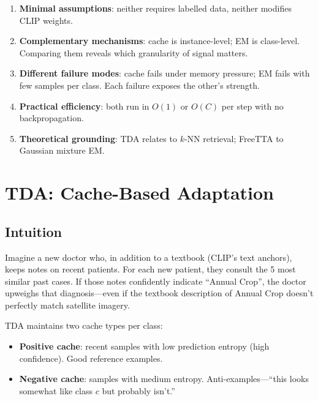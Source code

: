 \documentclass[12pt,a4paper]{article}
\newcommand{\1}{\mathbf{1}}
\begin{document}
\begin{enumerate}[leftmargin=1.5em]
  \item \textbf{Minimal assumptions}: neither requires labelled data, neither modifies CLIP weights.
  \item \textbf{Complementary mechanisms}: cache is instance-level; EM is class-level.
        Comparing them reveals which granularity of signal matters.
  \item \textbf{Different failure modes}: cache fails under memory pressure; EM fails with few samples per class.
        Each failure exposes the other's strength.
  \item \textbf{Practical efficiency}: both run in $O(1)$ or $O(C)$ per step with no backpropagation.
  \item \textbf{Theoretical grounding}: TDA relates to $k$-NN retrieval; FreeTTA to Gaussian mixture EM.
\end{enumerate}

\section{TDA: Cache-Based Adaptation}

\subsection{Intuition}

\begin{tcolorbox}[intuitionbox]
Imagine a new doctor who, in addition to a textbook (CLIP's text anchors), keeps notes on recent patients.
For each new patient, they consult the 5 most similar past cases.
If those notes confidently indicate ``Annual Crop'', the doctor upweighs that diagnosis---even if the textbook description of Annual Crop doesn't perfectly match satellite imagery.
\end{tcolorbox}

TDA maintains two cache types per class:
\begin{itemize}
  \item \textbf{Positive cache}: recent samples with low prediction entropy (high confidence). Good reference examples.
  \item \textbf{Negative cache}: samples with medium entropy. Anti-examples---``this looks somewhat like class $c$ but probably isn't.''
\end{itemize}
\end{document}
